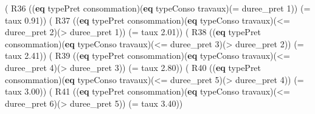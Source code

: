 \documentclass[
]{article}
\newenvironment{Shaded}{}{}
\newcommand{\DecValTok}[1]{\textcolor[rgb]{0.25,0.63,0.44}{#1}}
\newcommand{\FloatTok}[1]{\textcolor[rgb]{0.25,0.63,0.44}{#1}}
\newcommand{\KeywordTok}[1]{\textcolor[rgb]{0.00,0.44,0.13}{\textbf{#1}}}
\newcommand{\NormalTok}[1]{#1}
\newcommand{\OperatorTok}[1]{\textcolor[rgb]{0.40,0.40,0.40}{#1}}
\begin{document}
\begin{Shaded}
\begin{Highlighting}[]
\NormalTok{( R36 ((}\KeywordTok{eq}\NormalTok{ typePret consommation)(}\KeywordTok{eq}\NormalTok{ typeConso travaux)(}\OperatorTok{=}\NormalTok{ duree\_pret }\DecValTok{1}\NormalTok{)) (}\OperatorTok{=}\NormalTok{ taux }\FloatTok{0.91}\NormalTok{))}
\NormalTok{( R37 ((}\KeywordTok{eq}\NormalTok{ typePret consommation)(}\KeywordTok{eq}\NormalTok{ typeConso travaux)(}\OperatorTok{\textless{}=}\NormalTok{ duree\_pret }\DecValTok{2}\NormalTok{)(}\OperatorTok{\textgreater{}}\NormalTok{ duree\_pret }\DecValTok{1}\NormalTok{)) }
\NormalTok{    (}\OperatorTok{=}\NormalTok{ taux }\FloatTok{2.01}\NormalTok{))}
\NormalTok{( R38 ((}\KeywordTok{eq}\NormalTok{ typePret consommation)(}\KeywordTok{eq}\NormalTok{ typeConso travaux)(}\OperatorTok{\textless{}=}\NormalTok{ duree\_pret }\DecValTok{3}\NormalTok{)(}\OperatorTok{\textgreater{}}\NormalTok{ duree\_pret }\DecValTok{2}\NormalTok{)) }
\NormalTok{    (}\OperatorTok{=}\NormalTok{ taux }\FloatTok{2.41}\NormalTok{))}
\NormalTok{( R39 ((}\KeywordTok{eq}\NormalTok{ typePret consommation)(}\KeywordTok{eq}\NormalTok{ typeConso travaux)(}\OperatorTok{\textless{}=}\NormalTok{ duree\_pret }\DecValTok{4}\NormalTok{)(}\OperatorTok{\textgreater{}}\NormalTok{ duree\_pret }\DecValTok{3}\NormalTok{)) }
\NormalTok{    (}\OperatorTok{=}\NormalTok{ taux }\FloatTok{2.80}\NormalTok{))}
\NormalTok{( R40 ((}\KeywordTok{eq}\NormalTok{ typePret consommation)(}\KeywordTok{eq}\NormalTok{ typeConso travaux)(}\OperatorTok{\textless{}=}\NormalTok{ duree\_pret }\DecValTok{5}\NormalTok{)(}\OperatorTok{\textgreater{}}\NormalTok{ duree\_pret }\DecValTok{4}\NormalTok{)) }
\NormalTok{    (}\OperatorTok{=}\NormalTok{ taux }\FloatTok{3.00}\NormalTok{))}
\NormalTok{( R41 ((}\KeywordTok{eq}\NormalTok{ typePret consommation)(}\KeywordTok{eq}\NormalTok{ typeConso travaux)(}\OperatorTok{\textless{}=}\NormalTok{ duree\_pret }\DecValTok{6}\NormalTok{)(}\OperatorTok{\textgreater{}}\NormalTok{ duree\_pret }\DecValTok{5}\NormalTok{)) }
\NormalTok{    (}\OperatorTok{=}\NormalTok{ taux }\FloatTok{3.40}\NormalTok{))}


\end{Highlighting}
\end{Shaded}
\end{document}
